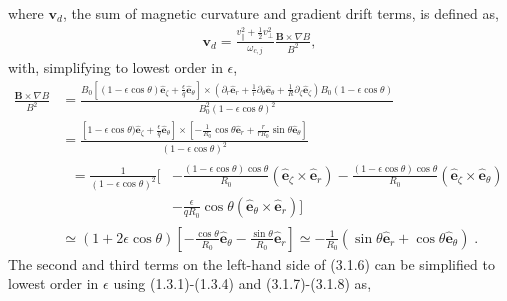 \documentclass[12pt]{article}
\numberwithin{equation}{subsection}
\begin{document}
where $\bm{v}_d$, the sum of magnetic curvature and gradient drift terms, is defined as,
   \begin{equation}
   \begin{aligned}
      \bm{v}_d = \frac{v_\parallel^2 + \frac{1}{2} v_\perp^2}{\omega_{c,j}}\frac{\bm{B}\times\nabla B}{B^2},
   \end{aligned}
   \end{equation}
with, simplifying to lowest order in $\epsilon$,
   \begin{equation}
   \begin{aligned}
      \frac{\bm{B}\times\nabla B}{B^2} &= \frac{B_0[(1-\epsilon\cos\theta)\bm{\hat{e}}_\zeta + \frac{\epsilon}{q}\bm{\hat{e}}_\theta]
      \times(\partial_r\bm{\hat{e}}_r + \frac{1}{r}\partial_\theta\bm{\hat{e}}_\theta + \frac{1}{R}\partial_\zeta\bm{\hat{e}}_\zeta)
      B_0(1-\epsilon\cos\theta)}{B_0^2(1-\epsilon\cos\theta)^2} \\ &=
      \frac{[1-\epsilon\cos\theta)\bm{\hat{e}}_\zeta + \frac{\epsilon}{q}\bm{\hat{e}}_\theta]
      \times[-\frac{1}{R_0}\cos\theta\bm{\hat{e}}_r + \frac{r}{r R_0}\sin\theta\bm{\hat{e}}_\theta]}{(1-\epsilon\cos\theta)^2} \\ &
      \begin{aligned}
         \;= \frac{1}{(1-\epsilon\cos\theta)^2}[&-\frac{(1-\epsilon\cos\theta)\cos\theta}{R_0}(\bm{\hat{e}}_\zeta\times\bm{\hat{e}}_r)
                                                 -\frac{(1-\epsilon\cos\theta)\cos\theta}{R_0}(\bm{\hat{e}}_\zeta\times\bm{\hat{e}}_\theta) \\
                                                &-\frac{\epsilon}{q R_0}\cos\theta(\bm{\hat{e}}_\theta\times\bm{\hat{e}}_r)]
      \end{aligned}         
      \\ &\simeq (1+2\epsilon\cos\theta)[-\frac{\cos\theta}{R_0}\bm{\hat{e}}_\theta-\frac{\sin\theta}{R_0}\bm{\hat{e}}_r]
          \simeq -\frac{1}{R_0}(\sin\theta\bm{\hat{e}}_r + \cos\theta\bm{\hat{e}}_\theta)\;.
   \end{aligned}
   \end{equation}
The second and third terms on the left-hand side of (3.1.6) can be simplified to lowest order in $\epsilon$ using (1.3.1)-(1.3.4) and
(3.1.7)-(3.1.8) as,
\end{document}
